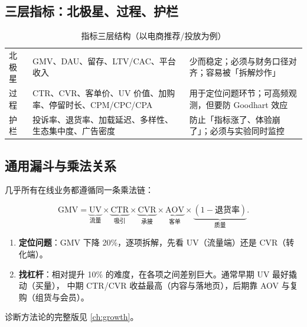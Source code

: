 \subsection{三层指标：北极星、过程、护栏}

\begin{table}[htbp]
\centering
\caption{指标三层结构（以电商推荐/投放为例）}
\label{tab:metrics3}
\small
\begin{tabularx}{\textwidth}{L{1.9cm} L{4.2cm} Y}
\toprule
{} &  &  \\
\midrule
北极星 & GMV、DAU、留存、LTV/CAC、平台收入 & 少而稳定；必须与财务口径对齐；容易被「拆解炒作」 \\
\addlinespace
过程 & CTR、CVR、客单价、UV 价值、加购率、停留时长、CPM/CPC/CPA & 用于定位问题环节；可高频观测，但要防 Goodhart 效应 \\
\addlinespace
护栏 & 投诉率、退货率、加载延迟、多样性、生态集中度、广告密度 & 防止「指标涨了、体验崩了」；必须与实验同时监控 \\
\bottomrule
\end{tabularx}
\end{table}

\subsection{通用漏斗与乘法关系}

几乎所有在线业务都遵循同一条乘法链：

\begin{equation}
\text{GMV} = \underbrace{\text{UV}}_{\text{流量}} \times \underbrace{\text{CTR}}_{\text{吸引}} \times \underbrace{\text{CVR}}_{\text{承接}} \times \underbrace{\text{AOV}}_{\text{客单}} \times \underbrace{(1 - \text{退货率})}_{\text{质量}} .
\label{eq:funnel-chain}
\end{equation}

\begin{insight}[乘法链的两个用途]
\begin{enumerate}
  \item \textbf{定位问题}：GMV 下降 20\%，逐项拆解，先看 UV（流量端）还是 CVR（转化端）。
  \item \textbf{找杠杆}：相对提升 10\% 的难度，在各项之间差别巨大。通常早期 UV 最好撬动（买量），
        中期 CTR/CVR 收益最高（内容与落地页），后期靠 AOV 与复购（组货与会员）。
\end{enumerate}
诊断方法论的完整版见 \cref{ch:growth}。
\end{insight}

